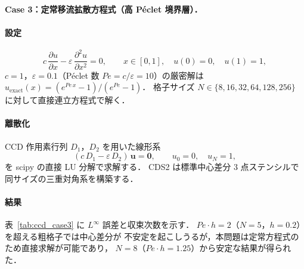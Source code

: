 \paragraph{Case 3：定常移流拡散方程式（高 Péclet 境界層）．}\label{app:ccd_case3}

\paragraph{設定}
\begin{equation}
  c\,\frac{\partial u}{\partial x} - \varepsilon\,\frac{\partial^2 u}{\partial x^2} = 0,
  \qquad x \in [0,1],\quad u(0)=0,\quad u(1)=1,
  \label{eq:ccd_advdiff}
\end{equation}
$c=1$，$\varepsilon = 0.1$（Péclet 数 $Pe = c/\varepsilon = 10$）の厳密解は
$u_{\mathrm{exact}}(x) = (e^{Pe\,x} - 1)/(e^{Pe} - 1)$．
格子サイズ $N \in \{8, 16, 32, 64, 128, 256\}$ に対して直接連立方程式で解く．

\paragraph{離散化}
CCD 作用素行列 $D_1$，$D_2$ を用いた線形系
\begin{equation}
  (c\,D_1 - \varepsilon\,D_2)\,\mathbf{u} = \mathbf{0},
  \qquad u_0 = 0,\quad u_N = 1,
  \label{eq:ccd_advdiff_sys}
\end{equation}
を scipy の直接 LU 分解で求解する．
CDS2 は標準中心差分 3 点ステンシルで同サイズの三重対角系を構築する．

\paragraph{結果}
表~\ref{tab:ccd_case3} に $L^\infty$ 誤差と収束次数を示す．
$Pe \cdot h = 2$（$N=5$，$h=0.2$）を超える粗格子では中心差分が
不安定を起こしうるが，本問題は定常方程式のため直接求解が可能であり，
$N=8$（$Pe \cdot h = 1.25$）から安定な結果が得られた．

